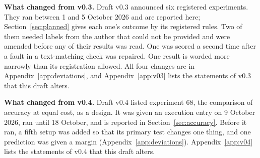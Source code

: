\documentclass[10pt,twocolumn]{article}
\begin{document}
\textbf{What changed from v0.3.} Draft v0.3 announced six registered
experiments. They ran between 1 and 5 October 2026 and are reported
here; Section~\ref{sec:planned} gives each one's outcome by its
registered rules. Two of them needed labels from the author that could
not be provided and were amended before any of their results was read.
One was scored a second time after a fault in a text-matching check was
repaired. One result is worded more narrowly than its registration
allowed. All four changes are in Appendix~\ref{app:deviations}, and
Appendix~\ref{app:v03} lists the statements of v0.3 that this draft
alters.

\textbf{What changed from v0.4.} Draft v0.4 listed experiment 68, the
comparison of accuracy at equal cost, as a design. It was given an
execution entry on 9 October 2026, ran until 18 October, and is
reported in Section~\ref{sec:accuracy}. Before it ran, a fifth setup was
added so that its primary test changes one thing, and one prediction was
given a margin (Appendix~\ref{app:deviations}). Appendix~\ref{app:v04}
lists the statements of v0.4 that this draft alters.
\end{document}
